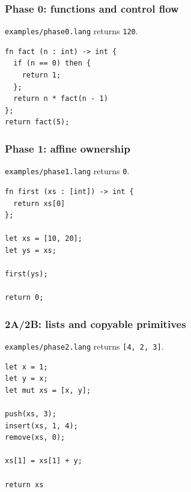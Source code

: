 \documentclass[a4paper]{article}
\begin{document}
\begingroup
\lstset{basicstyle=\scriptsize\ttfamily, framesep=3pt}
\noindent\begin{minipage}[t]{0.48\linewidth}

\subsubsection{Phase 0: functions and control flow}
\label{appendix:example-phase0}

\texttt{examples/phase0.lang} returns \texttt{120}.
\begin{lstlisting}
fn fact (n : int) -> int {
  if (n == 0) then {
    return 1;
  };
  return n * fact(n - 1)
};
return fact(5);
\end{lstlisting}

\subsubsection{Phase 1: affine ownership}
\label{appendix:example-phase1}

\texttt{examples/phase1.lang} returns \texttt{0}.
\begin{lstlisting}
fn first (xs : [int]) -> int {
  return xs[0]
};

let xs = [10, 20];
let ys = xs;

first(ys);

return 0;
\end{lstlisting}

\subsubsection{2A/2B: lists and copyable primitives}
\label{appendix:example-phase2}

\texttt{examples/phase2.lang} returns \texttt{[4, 2, 3]}.
\begin{lstlisting}
let x = 1;
let y = x;
let mut xs = [x, y];

push(xs, 3);
insert(xs, 1, 4);
remove(xs, 0);

xs[1] = xs[1] + y;

return xs
\end{lstlisting}

\end{minipage}\hfill
\end{document}
